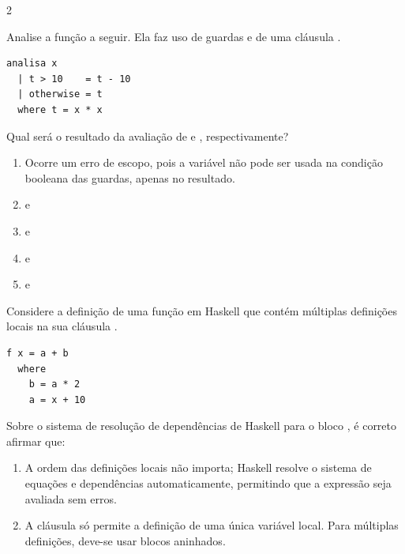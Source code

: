 \documentclass[a4paper,10pt,brazil]{article}
\begin{document}
\begin{multicols}{2}
\begin{enumerate}
\end{enumerate}

Analise a função a seguir. Ela faz uso de guardas e de uma cláusula .

\begin{verbatim}
analisa x
  | t > 10    = t - 10
  | otherwise = t
  where t = x * x
\end{verbatim}

Qual será o resultado da avaliação de  e , respectivamente?

\begin{enumerate}
  \item Ocorre um erro de escopo, pois a variável  não pode ser usada na condição booleana das guardas, apenas no resultado.

  \item {} e 

  \item {} e 

  \item {} e 

  \item {} e 


\end{enumerate}

Considere a definição de uma função  em Haskell que contém múltiplas definições locais na sua cláusula . 
\begin{verbatim}
f x = a + b
  where
    b = a * 2
    a = x + 10
\end{verbatim}
Sobre o sistema de resolução de dependências de Haskell para o bloco , é correto afirmar que:

\begin{enumerate}
  \item A ordem das definições locais não importa; Haskell resolve o sistema de equações e dependências automaticamente, permitindo que a expressão seja avaliada sem erros.

  \item A cláusula  só permite a definição de uma única variável local. Para múltiplas definições, deve-se usar blocos  aninhados.


\end{enumerate}
\end{multicols}
\end{document}
